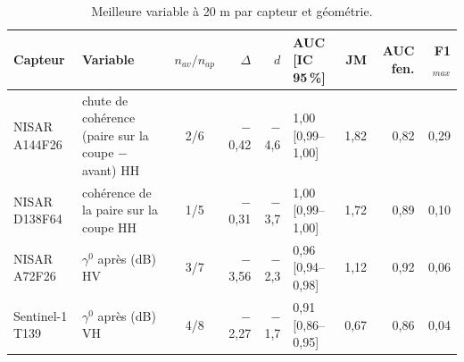 \begin{table}[htbp]
\centering
\scriptsize
\caption{Meilleure variable à 20 m par capteur et géométrie.}
\label{tab:best}
\begin{tabular}{llcrrlrrr}
\toprule
Capteur & Variable & $n_{av}/n_{ap}$ & $\Delta$ & $d$ & AUC [IC 95\,\%] & JM & AUC fen. & F1$_{max}$ \\
\midrule
NISAR A144F26 & chute de cohérence (paire sur la coupe $-$ avant) HH & 2/6 & $-$0{,}42 & $-$4{,}6 & 1{,}00 [0{,}99--1{,}00] & 1{,}82 & 0{,}82 & 0{,}29 \\
\addlinespace
NISAR D138F64 & cohérence de la paire sur la coupe HH & 1/5 & $-$0{,}31 & $-$3{,}7 & 1{,}00 [0{,}99--1{,}00] & 1{,}72 & 0{,}89 & 0{,}10 \\
\addlinespace
NISAR A72F26 & $\gamma^0$ après (dB) HV & 3/7 & $-$3{,}56 & $-$2{,}3 & 0{,}96 [0{,}94--0{,}98] & 1{,}12 & 0{,}92 & 0{,}06 \\
\addlinespace
Sentinel-1 T139 & $\gamma^0$ après (dB) VH & 4/8 & $-$2{,}27 & $-$1{,}7 & 0{,}91 [0{,}86--0{,}95] & 0{,}67 & 0{,}86 & 0{,}04 \\
\bottomrule
\end{tabular}
\end{table}
